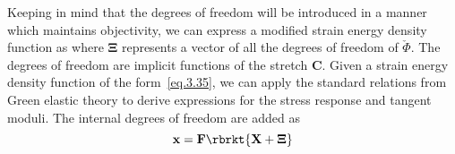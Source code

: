 Keeping in mind that the degrees of freedom will be introduced in a manner which 
maintains objectivity, we can express a modified strain energy density function
as
where $\boldsymbol{\Xi}$ represents a vector of all the degrees of freedom of
$\check{\Phi}$. The degrees of freedom are implicit functions of the stretch $\mathbf{C}$.
Given a strain energy density function of the form~\eqref{eq.3.35}, we can apply
the standard relations from Green elastic theory to derive expressions for the
stress response and tangent moduli. The internal degrees of freedom are
added as
\begin{equation}
\mathbf{x} = \mathbf{F} \rbrkt{\mathbf{X} + \boldsymbol{\Xi}}	
\end{equation}

